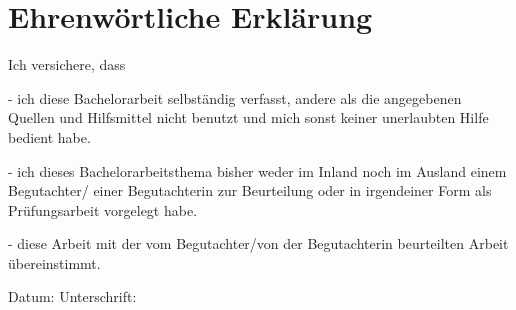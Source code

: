 \chapter*{Ehrenwörtliche Erklärung}
\label{ch:erklaerung}

\begin{flushleft}
Ich versichere, dass 
\end{flushleft}

\begin{flushleft}
- ich diese Bachelorarbeit selbständig verfasst, andere als die angegebenen Quellen und Hilfsmittel nicht benutzt und mich sonst keiner unerlaubten Hilfe bedient habe.
\end{flushleft}

\begin{flushleft}
- ich dieses Bachelorarbeitsthema bisher weder im Inland noch im Ausland einem Begutachter/ einer Begutachterin zur Beurteilung oder in irgendeiner Form als Prüfungsarbeit vorgelegt habe.	
\end{flushleft}

\begin{flushleft}
- diese Arbeit mit der vom Begutachter/von der Begutachterin beurteilten Arbeit übereinstimmt. \\[1.5cm]	
\end{flushleft}
Datum:	\hrulefill\enspace Unterschrift: \hrulefill
\\[3.5cm]